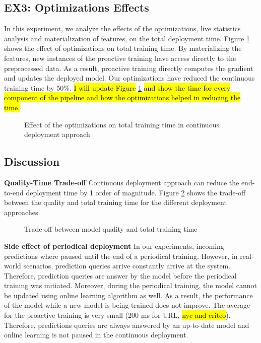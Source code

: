 \subsection{EX3: Optimizations Effects}
In this experiment, we analyze the effects of the optimizations, live statistics analysis and materialization of features, on the total deployment time.
Figure \ref{optimization-effect} shows the effect of optimizations on total training time.
By materializing the features, new instances of the proactive training have access directly to the preprocessed data.
As a result, proactive training directly computes the gradient and updates the deployed model.
Our optimizations have reduced the continuous training time by 50\%.
\hl{I will update Figure} \ref{optimization-effect} \hl{and show the time for every component of the pipeline and how the optimizations helped in reducing the time.}
\begin{figure}[h!]
\centering
\resizebox{\columnwidth}{!}{}
\caption{Effect of the optimizations on total training time in continuous deployment approach}
\label{optimization-effect}
\end{figure}

\subsection{Discussion} \label{subsec:discussion}
\textbf{Quality-Time Trade-off}
Continuous deployment approach can reduce the end-to-end deployment time by 1 order of magnitude.
Figure \ref{quality-vs-time} shows the trade-off between the quality and total training time for the different deployment approaches.

\begin{figure}[!h]
\centering
\resizebox{\columnwidth}{!}{}
\caption{Trade-off between model quality and total training time}
\label{quality-vs-time}
\end{figure}


\textbf{Side effect of periodical deployment}
In our experiments, incoming predictions where paused until the end of a periodical training.
However, in real-world scenarios, prediction queries arrive constantly arrive at the system.
Therefore, prediction queries are answer by the model before the periodical training was initiated. 
Moreover, during the periodical training, the model cannot be updated using online learning algorithm as well.
As a result, the performance of the model while a new model is being trained does not improve.
The average for the proactive training is very small (200 ms for URL, \hl{nyc and criteo}).
Therefore, predictions queries are always answered by an up-to-date model and online learning is not paused in the continuous deployment.


